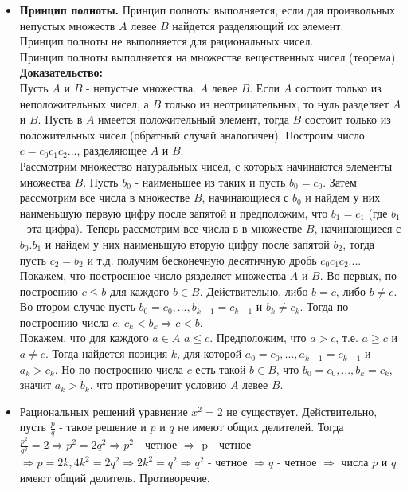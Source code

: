 \documentclass[12pt,a4paper]{article}
\begin{document}
\begin{itemize}
\item \textbf{Принцип полноты. }
Принцип полноты выполняется, если для произвольных непустых множеств $A$ левее $B$ найдется разделяющий их элемент. \\
Принцип полноты не выполняется для рациональных чисел. \\
Принцип полноты выполняется на множестве вещественных чисел (теорема).\\
\textbf{Доказательство:} \\
Пусть $A$ и $B$ - непустые множества.  $A$ левее $B$. Если $A$ состоит только из неположительных чисел, а $B$ только из неотрицательных, то нуль разделяет $A$ и $B$. Пусть в $A$ имеется положительный элемент, тогда $B$ состоит только из положительных чисел (обратный случай аналогичен). Построим число $c = c_0c_1c_2...$, разделяющее $A$ и $B$. \\
Рассмотрим множество натуральных чисел, с которых начинаются элементы множества $B$. Пусть $b_0$ - наименьшее из таких и пусть $b_0 = c_0$. Затем рассмотрим все числа в множестве $B$, начинающиеся с $b_0$ и найдем у них наименьшую первую цифру после запятой и предположим, что $b_1=c_1$ (где $b_1$ - эта цифра). Теперь рассмотрим все числа в в множестве $B$, начинающиеся с $b_0.b_1$ и найдем у них наименьшую вторую цифру после запятой $b_2$, тогда пусть $c_2=b_2$  и т.д. получим бесконечную десятичную дробь $c_0c_1c_2...$. Покажем, что построенное число рязделяет множества $A$ и $B$. Во-первых, по построению $c \leq b$ для каждого $b \in B$. Действительно, либо $b = c$, либо $b \neq c$. Во втором случае пусть $b_0 = c_0, ..., b_{k-1} = c_{k-1}$ и $b_k \neq c_k$. Тогда по построению числа $c$, $c_k < b_k \Rightarrow c < b$. \\
Покажем, что для каждого $a \in A $ $a \leq c$. Предположим, что $a > c$, т.е. $a \geq c$ и $a \neq c$. Тогда найдется позиция $k$, для которой $a_0=c_0, ..., a_{k-1}=c_{k-1}$ и $a_k > c_k$. Но по построению числа $c$ есть такой $b \in B$, что $b_0 = c_0, ..., b_k=c_k$, значит $a_k > b_k$, что противоречит условию $A$ левее $B$. 

\item Рациональных решений уравнение $x^2=2$ не существует. Действительно, пусть $\frac{p}{q}$ - такое решение и $p$ и $q$ не имеют общих делителей. Тогда $\frac{p^2}{q^2} = 2 \Rightarrow p^2=2q^2 \Rightarrow p^2$ - четное $\Rightarrow$ p - четное $\Rightarrow p=2k, 4k^2=2q^2 \Rightarrow 2k^2 = q^2 \Rightarrow q^2$ - четное $\Rightarrow q$ - четное $\Rightarrow$ числа $p$ и $q$ имеют общий делитель. Противоречие.
\end{itemize}
\end{document}
